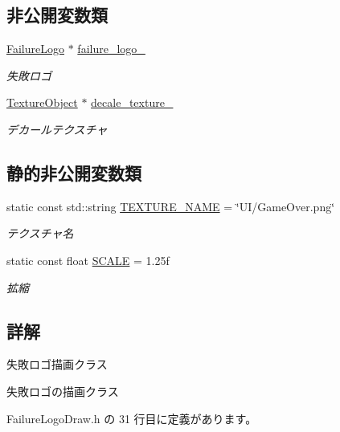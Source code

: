 \subsection*{非公開変数類}
\begin{DoxyCompactItemize}
\item 
\mbox{\hyperlink{class_failure_logo}{Failure\+Logo}} $\ast$ \mbox{\hyperlink{class_failure_logo_draw_aa6b60e289acc232d5bd1bc5a656a2551}{failure\+\_\+logo\+\_\+}}
\begin{DoxyCompactList}\small\item\em 失敗ロゴ \end{DoxyCompactList}\item 
\mbox{\hyperlink{class_texture_object}{Texture\+Object}} $\ast$ \mbox{\hyperlink{class_failure_logo_draw_a02463e67fa2053739c667bb1213e1b9e}{decale\+\_\+texture\+\_\+}}
\begin{DoxyCompactList}\small\item\em デカールテクスチャ \end{DoxyCompactList}\end{DoxyCompactItemize}
\subsection*{静的非公開変数類}
\begin{DoxyCompactItemize}
\item 
static const std\+::string \mbox{\hyperlink{class_failure_logo_draw_a287b81d9dcab4be17a88d9aff7c97a9a}{T\+E\+X\+T\+U\+R\+E\+\_\+\+N\+A\+ME}} = \char`\"{}UI/Game\+Over.\+png\char`\"{}
\begin{DoxyCompactList}\small\item\em テクスチャ名 \end{DoxyCompactList}\item 
static const float \mbox{\hyperlink{class_failure_logo_draw_a356d2f6f14682ad6f2e9a01ffdd587b0}{S\+C\+A\+LE}} = 1.\+25f
\begin{DoxyCompactList}\small\item\em 拡縮 \end{DoxyCompactList}\end{DoxyCompactItemize}


\subsection{詳解}
失敗ロゴ描画クラス 

失敗ロゴの描画クラス 

 Failure\+Logo\+Draw.\+h の 31 行目に定義があります。



